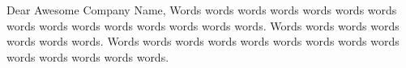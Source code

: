 Dear Awesome Company Name,\newline 
 \newline Words words words words words words words words words words words words words words words. Words words words words words words words. Words words words words words words words words words words words words words words.